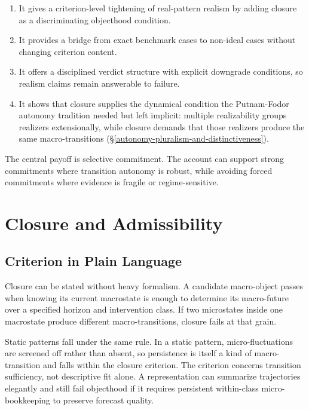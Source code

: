 \begin{enumerate}
	\item
	      It gives a criterion-level tightening of real-pattern realism by
	      adding closure as a discriminating objecthood condition.
	\item
	      It provides a bridge from exact benchmark cases to non-ideal cases
	      without changing criterion content.
	\item
	      It offers a disciplined verdict structure with explicit downgrade
	      conditions, so realism claims remain answerable to failure.
	\item
	      It shows that closure supplies the dynamical condition the
	      Putnam-Fodor autonomy tradition needed but left implicit:
	      multiple realizability groups realizers extensionally, while
	      closure demands that those realizers produce the same
	      macro-transitions (\S\ref{autonomy-pluralism-and-distinctiveness}).
\end{enumerate}

The central payoff is selective commitment. The account can support
strong commitments where transition autonomy is robust, while avoiding
forced commitments where evidence is fragile or regime-sensitive.

\section{Closure and Admissibility}\label{closure-and-admissibility}

\subsection{Criterion in Plain
	Language}\label{criterion-in-plain-language}

Closure can be stated without heavy formalism. A candidate macro-object
passes when knowing its current macrostate is enough to determine
its macro-future over a specified horizon and intervention
class. If two microstates inside one macrostate produce different
macro-transitions, closure fails at that grain.

Static patterns fall under the same rule. In a static pattern,
micro-fluctuations are screened off rather than absent, so persistence
is itself a kind of macro-transition and falls within the closure
criterion. The criterion concerns transition sufficiency, not
descriptive fit alone. A representation can summarize trajectories
elegantly and still fail objecthood if it requires persistent
within-class micro-bookkeeping to preserve forecast quality.

